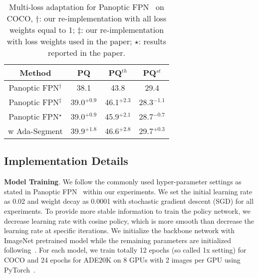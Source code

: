 \documentclass[letterpaper]{article} \usepackage{aaai21}  \usepackage{times}  \usepackage{helvet} \usepackage{courier}  \usepackage[hyphens]{url}  \usepackage{graphicx} \urlstyle{rm} \def\UrlFont{\rm}  \usepackage{natbib}  \usepackage{caption} \frenchspacing  \setlength{\pdfpagewidth}{8.5in}  \setlength{\pdfpageheight}{11in}
\begin{document}
  \begin{table}[t]
    \begin{centering}
    \tabcolsep 0.05in\renewcommand{\arraystretch}{1.2}{\footnotesize{}}\begin{tabular}{c|ccc}
    \hline 
    Method & PQ & PQ$^{th}$ & PQ$^{st}$\tabularnewline
    \hline 
    Panoptic FPN$^{\dagger}$ & 38.1 & 43.8 & 29.4\tabularnewline
    Panoptic FPN$^{\ddagger}$ & 39.0$^{+0.9}$ & 46.1$^{+2.3}$ & 28.3$^{-1.1}$\tabularnewline
    Panoptic FPN$^{\star}$ & 39.0$^{+0.9}$ & 45.9$^{+2.1}$ & 28.7$^{-0.7}$\tabularnewline
    w Ada-Segment & 39.9$^{+1.8}$ & 46.6$^{+2.8}$ & 29.7$^{+0.3}$\tabularnewline
    \hline 
    \end{tabular}{\footnotesize\par}
    \par\end{centering}
\caption{\label{tab:Evaluation-on-panopticfpn}Multi-loss adaptation for Panoptic FPN~\cite{panopticFPNkirillov2019} on COCO, 
    ${\dagger}$: our re-implementation with all loss weights equal to 1; $\ddagger$: our re-implementation
    with loss weights used in the paper; $\star$: results reported in the paper.}
\end{table}    


 \subsection{Implementation Details}
 \noindent
 \textbf{Model Training}. We follow the commonly used hyper-parameter settings as stated in 
 Panoptic FPN~\cite{panopticFPNkirillov2019} within our experiments. 
 We set the initial learning rate as 0.02
 and weight decay as 0.0001 with stochastic gradient descent
 (SGD) for all experiments. 
 To provide more stable information to train the policy network, we decrease learning
 rate with cosine policy, which is more smooth than decrease the learning
 rate at specific iterations. We initialize the backbone network with ImageNet
 pretrained model while the remaining parameters are initialized following~\cite{he2015init}. 
 For each model, we train totally 12 epochs (so called 1x setting) for COCO 
 and 24 epochs for ADE20K 
 on 8 GPUs with 2 images per GPU using PyTorch~\cite{paszke2017automatic}.
\end{document}

